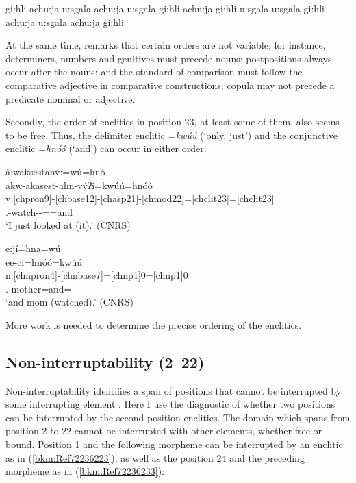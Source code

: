 \documentclass[output=paper]{langscibook}
\begin{document}
\ea\label{ex:cher:key:65}{gi:hli achu:ja u:sgala} 
\z
\ea\label{ex:cher:key:66}{achu:ja u:sgala gi:hli}
\z
\ea\label{ex:cher:key:67}{achu:ja gi:hli u:sgala}
\z
\ea\label{bkm:Ref72236976}{u:sgala gi:hli achu:ja}
\z
\ea\label{bkm:Ref72236947}{u:sgala achu:ja gi:hli}
\z


At the same time, \citet[173ff.]{Scancarelli1987} remarks that certain orders are not variable; for instance, determiners, numbers and genitives must precede nouns; postpositions always occur after the nouns; and the standard of comparison must follow the comparative adjective in comparative constructions; copula may not precede a predicate nominal or adjective.

Secondly, the order of enclitics in position 23, at least some of them, also seems to be free. Thus, the delimiter enclitic =\textit{kwúú} (`only, just') and the conjunctive enclitic =\textit{hnóó} (`and') can occur in either order. 

\ea\label{ex:cher:key:70} { à:waksestan\'{v}:=wú=hnó}  \\
\glll akw-akasest-ahn-vv́ʔi=kwúú=hnóó \\
v:\ref{chpron9}-\ref{chbase12}-\ref{chasp21}-\ref{chmod22}=\ref{chclit23}=\ref{chclit23}\\ 
\First\Sg.\Barg{}-watch-\Prf{}-\Asr{}=\Dt{}=and\\
\glt `I just looked at (it).' (CNRS)
\z 

\ea\label{ex:cher:key:71} {e:jí=hna=wú}\\
\glll ee-ci=hnóó=kwúú \\
n:\ref{chnpron4}-\ref{chnbase7}=\ref{chnp1}0=\ref{chnp1}0\\ 
\First\Sg.\Barg{}-mother=and=\Dt{}\\
\glt `and mom (watched).' (CNRS)
\z 

More work is needed to determine the precise ordering of the enclitics.


\subsection{Non-interruptability (2--22)}
\label{bkm:Ref87350419}
Non-interruptability identifies a span of positions that cannot be interrupted by some interrupting element \citep[20]{Tallman2020}. Here I use the diagnostic of whether two positions can be interrupted by the second position enclitics. The domain which spans from position 2 to 22 cannot be interrupted with other elements, whether free or bound. Position 1 and the following morpheme can be interrupted by an enclitic as in (\ref{bkm:Ref72236223}), as well as the position 24 and the preceding morpheme as in (\ref{bkm:Ref72236233}):
\end{document}
